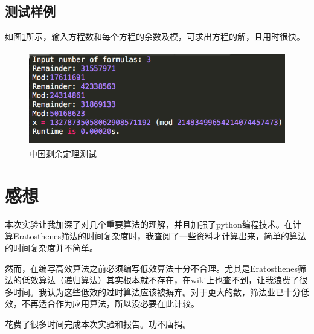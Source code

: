 \documentclass[11pt]{ctexart}
\begin{document}
\subsection{测试样例}
如图\ref{img_crt}所示，输入方程数和每个方程的余数及模，可求出方程的解，且用时很快。
\begin{figure}[htbp]
\centering
\includegraphics[height=4.12cm,width=11.94cm]{crt.png}
\caption{中国剩余定理测试}
\label{img_crt}
\end{figure}

\section{感想}
本次实验让我加深了对几个重要算法的理解，并且加强了python编程技术。在计算Eratosthenes筛法的时间复杂度时，我查阅了一些资料才计算出来，简单的算法的时间复杂度并不简单。

然而，在编写高效算法之前必须编写低效算法十分不合理。尤其是Eratosthenes筛法的低效算法（递归算法）其实根本就不存在，在wiki上也查不到，让我浪费了很多时间。我认为这些低效的过时算法应该被摒弃。对于更大的数，筛法业已十分低效，不再适合作为应用算法，所以没必要在此计较。

花费了很多时间完成本次实验和报告。功不唐捐。
\end{document}
